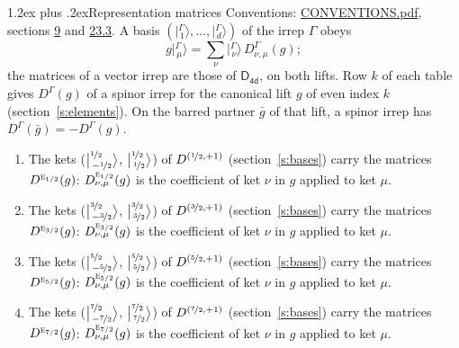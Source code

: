 \documentclass[10pt,a4paper]{article}
\makeatletter
\renewcommand\section{\@startsection{section}{1}{\z@}{-3ex plus -1ex minus -.2ex}%
  {1.2ex plus .2ex}{\normalfont\large\sffamily\bfseries\color{parttitle}}}
\numberwithin{equation}{section}
\newcommand{\grp}[1]{\mathsf{#1}}
\newcommand{\irr}[1]{\text{\normalfont\scshape #1}}
\newcommand{\irrJp}[2]{D^{(#1,#2)}}
\newcommand{\repD}[1]{D^{#1}}
\newcommand{\intx}{\mu}
\newcommand{\jm}[2]{\bigl\lvert{}^{#1}_{\,#2}\bigr\rangle}
\newcommand{\irket}[2]{\bigl\lvert{}^{#1}_{\,#2}\bigr\rangle}
\newcommand{\barred}[1]{\bar{#1}}
\newenvironment{romanlist}{\begin{enumerate}%
\renewcommand{\labelenumi}{(\roman{enumi})}}%
  {\end{enumerate}}
\makeatother
\begin{document}
\section{Representation matrices}\label{s:irrep_matrices}
Conventions: \href{../../CONVENTIONS.pdf}{CONVENTIONS.pdf}, sections \href{../../../rotation/CONVENTIONS.pdf\#conv.9}{9} and \href{../../CONVENTIONS.pdf\#conv.23.3}{23.3}.
\leavevmode\label{n:vector.ket.partner}\label{n:index.partner}\label{n:matrix.irrep}\label{n:index.partner.summed}A basis $(\irket{\Gamma}{1}, \dots, \irket{\Gamma}{d})$ of the irrep $\Gamma$ obeys
\begin{equation}\label{e:partner}g\irket{\Gamma}{\intx} = \sum_\nu \irket{\Gamma}{\nu}\, \repD{\Gamma}_{\nu,\intx}(g);\end{equation}
the matrices of a vector irrep are those of \href{../../../rotation/data/pdf/D4d.pdf}{$\grp{D_{4d}}$}, on both lifts. Row $k$ of each table gives $\repD{\Gamma}(g)$ of a spinor irrep for the canonical lift $g$ of even index $k$ (section~\ref{s:elements}). On the barred partner $\barred{g}$ of that lift, a spinor irrep has $\repD{\Gamma}(\barred{g}) = -\repD{\Gamma}(g)$.
\begin{romanlist}\raggedright
\item The kets ($\jm{\nicefrac{1}{2}}{-\nicefrac{1}{2}}$, $\jm{\nicefrac{1}{2}}{\nicefrac{1}{2}}$) of $\irrJp{\nicefrac{1}{2}}{+1}$ (section~\ref{s:bases}) carry the matrices $\repD{\irr{e}_{1/2}}(g)$: $\repD{\irr{e}_{1/2}}_{\nu,\intx}(g)$ is the coefficient of ket $\nu$ in $g$ applied to ket $\intx$.
\item The kets ($\jm{\nicefrac{3}{2}}{-\nicefrac{3}{2}}$, $\jm{\nicefrac{3}{2}}{\nicefrac{3}{2}}$) of $\irrJp{\nicefrac{3}{2}}{+1}$ (section~\ref{s:bases}) carry the matrices $\repD{\irr{e}_{3/2}}(g)$: $\repD{\irr{e}_{3/2}}_{\nu,\intx}(g)$ is the coefficient of ket $\nu$ in $g$ applied to ket $\intx$.
\item The kets ($\jm{\nicefrac{5}{2}}{-\nicefrac{5}{2}}$, $\jm{\nicefrac{5}{2}}{\nicefrac{5}{2}}$) of $\irrJp{\nicefrac{5}{2}}{+1}$ (section~\ref{s:bases}) carry the matrices $\repD{\irr{e}_{5/2}}(g)$: $\repD{\irr{e}_{5/2}}_{\nu,\intx}(g)$ is the coefficient of ket $\nu$ in $g$ applied to ket $\intx$.
\item The kets ($\jm{\nicefrac{7}{2}}{-\nicefrac{7}{2}}$, $\jm{\nicefrac{7}{2}}{\nicefrac{7}{2}}$) of $\irrJp{\nicefrac{7}{2}}{+1}$ (section~\ref{s:bases}) carry the matrices $\repD{\irr{e}_{7/2}}(g)$: $\repD{\irr{e}_{7/2}}_{\nu,\intx}(g)$ is the coefficient of ket $\nu$ in $g$ applied to ket $\intx$.
\end{romanlist}
\end{document}
